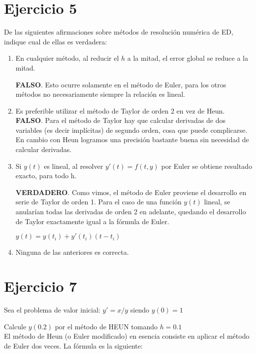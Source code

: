 \documentclass[11pt]{article}
\begin{document}
	\section{Ejercicio 5}
	De las siguientes afirmaciones sobre métodos de resolución numérica de ED, indique cual de ellas es verdadera:
	
	\begin{enumerate}[label=\alph*)]
		\item En cualquier método, al reducir el $h$ a la mitad, el error global se reduce a la mitad.
		
		\textbf{FALSO}. Esto ocurre solamente en el método de Euler, para los otros métodos no necesariamente siempre la relación es lineal.
		
		\item Es preferible utilizar el método de Taylor de orden 2 en vez de Heun.\\
		
		\textbf{FALSO}. Para el método de Taylor hay que calcular derivadas de dos variables (es decir implícitas) de segundo orden, cosa que puede complicarse. En cambio con Heun logramos una precisión bastante buena sin necesidad de calcular derivadas.\\
		
		\item Si $y(t)$ es lineal, al resolver $y'(t)=f(t,y)$ por Euler se obtiene resultado exacto, para todo h.
		
		\textbf{VERDADERO}. Como vimos, el método de Euler proviene el desarrollo en serie de Taylor de orden 1. Para el caso de una función $y(t)$ lineal, se anularían todas las derivadas de orden 2 en adelante, quedando el desarrollo de Taylor exactamente igual a la fórmula de Euler.
		
		$y(t)=y(t_i)+y'(t_i)(t-t_i)$
		
		\item Ninguna de las anteriores es correcta.
	\end{enumerate}

	\section{Ejercicio 7}
	Sea el problema de valor inicial: $y'=x/y$ siendo $y(0)=1$
	
	Calcule $y(0.2)$ por el método de HEUN tomando $h=0.1$\\
	
	El método de Heun (o Euler modificado) en esencia consiste en aplicar el método de Euler dos veces. La fórmula es la siguiente:
	
\end{document}
